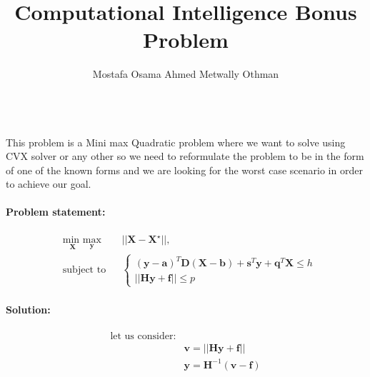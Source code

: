 \documentclass[12pt]{article}
\title{Computational Intelligence         Bonus Problem }
\author{Mostafa Osama Ahmed Metwally Othman}
\begin{document}
\\
This problem is a Mini max Quadratic problem where we want to solve using CVX solver or any other so we need to reformulate the problem to be in the form of one of the known forms and we are looking for the worst case scenario in order to achieve our goal.





\paragraph{Problem statement:}

%
\begin{equation}
\begin{aligned}
& \underset{\mathbf{X}}{\text{min   }}\underset{\mathbf{y}}{\text{max}}
& & || \mathbf{X} - \mathbf{ X^\star} ||, \\
& \text{subject to}
& & \begin{cases}

   (\mathbf{y}-\mathbf{a})^T \mathbf{D} (\mathbf{X}-\mathbf{b}) + \mathbf{s}^T \mathbf{y} + \mathbf{q}^T \mathbf{X} \leq h  \\
   ||\mathbf{H}\mathbf{y}+\mathbf{f}|| \leq p
    \end{cases}
\end{aligned}
\end{equation}

\paragraph{Solution:}



\begin{equation}
\begin{aligned}
\text{let us consider:}\\
& \mathbf{v} = ||\mathbf{H}\mathbf{y}+\mathbf{f}||\\
& \mathbf{y} = \mathbf{H}^{-1} (\mathbf{v} - \mathbf{f})\\
\end{aligned}
\end{equation}
\end{document}
